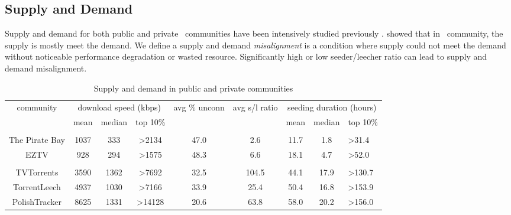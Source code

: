 \subsection{Supply and Demand}
\label{section:suppdemand}
Supply and demand for both public and private \bt~communities have been intensively studied previously \cite{2010:pubpriv:meulpolder, 2009:demandsupplyres:andrade}. \citeauthor{2009:demandsupplyres:andrade} showed that in \bt~community, the supply is mostly meet the demand. We define a supply and demand \textit{misalignment} is a condition where supply could not meet the demand without noticeable performance degradation or wasted resource. Significantly high or low seeder/leecher ratio can lead to supply and demand misalignment.

\begin{table}[]
	\centering
	\caption{Supply and demand in public and private communities \cite{2010:pubpriv:meulpolder}}
	\label{tbl:supdemand}
	\begin{adjustwidth}{-1.5cm}{}
		\begin{tabular}{|c|c|c|c|c|c|c|c|l|}
			\hline
			\multicolumn{1}{|c|}{\multirow{2}{0.1\linewidth}{community}} &  \multicolumn{3}{c|}{download speed (kbps)} & \multicolumn{1}{c|}{\multirow{2}{0.1\linewidth}{avg \% unconn}} & \multicolumn{1}{c|}{\multirow{2}{0.1\linewidth}{avg s/l ratio}} & \multicolumn{3}{c|}{seeding duration (hours)} \\ \cline{2-4} \cline{7-9} 
			\multicolumn{1}{|c|}{} & {mean} & {median} & {top 10\%} & {} & {} & {mean} & {median} & {top 10\%} \\ \hline
			\multicolumn{8}{l}{} \\ \hline
			The Pirate Bay & {1037} & {333} & {\textgreater2134} & {47.0} & {2.6} & {11.7} & {1.8} & {\textgreater31.4} \\ \hline
			EZTV  & {928} & {294} & {\textgreater1575} & {48.3} & {6.6} & {18.1} & {4.7} & {\textgreater52.0} \\ \hline
			\multicolumn{8}{l}{} \\ \hline
			TVTorrents & 3590 & 1362 & \textgreater7692 & 32.5 & 104.5 & 44.1 & 17.9 & \textgreater130.7 \\ \hline
			TorrentLeech  & {4937} & {1030} & {\textgreater7166} & {33.9} & {25.4} & {50.4} & {16.8} & {\textgreater153.9} \\ \hline
			PolishTracker  & {8625} & {1331} & {\textgreater14128} & {20.6} & {63.8} & {58.0} & {20.2} & {\textgreater156.0} \\ \hline
		\end{tabular}
	\end{adjustwidth}
\end{table}

